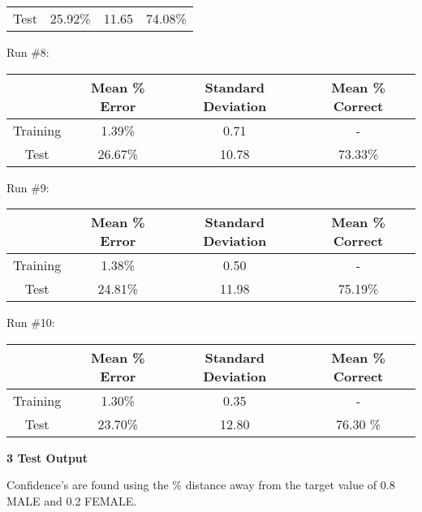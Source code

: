 \documentclass[11pt]{article}  %
\begin{document}
{{\begin{center}
\begin{tabular}{c|c|c|c}
\hline
Test & 25.92\% & 11.65 & 74.08\%
\end{tabular}
\end{center}
Run \#8: 
\begin{center}
\begin{tabular}{c|c|c|c}
& \textbf{Mean \% Error} & Standard Deviation & Mean \% Correct\\
\hline
Training & 1.39\% & 0.71 & - \\
\hline
Test & 26.67\% & 10.78 & 73.33\%
\end{tabular}
\end{center}
Run \#9: 
\begin{center}
\begin{tabular}{c|c|c|c}
& \textbf{Mean \% Error} & Standard Deviation & Mean \% Correct\\
\hline
Training & 1.38\% & 0.50 & - \\
\hline
Test & 24.81\% & 11.98 & 75.19\%
\end{tabular}
\end{center}
Run \#10: 
\begin{center}
\begin{tabular}{c|c|c|c}
& \textbf{Mean \% Error} & Standard Deviation & Mean \% Correct\\
\hline
Training & 1.30\% & 0.35 & - \\
\hline
Test & 23.70\% & 12.80 & 76.30 \%
\end{tabular}
\end{center}

\Large{\textbf{3 Test Output}
\normalsize

Confidence's are found using the \% distance away from the target value of 0.8 MALE and 0.2 FEMALE.

}}}
\end{document}
